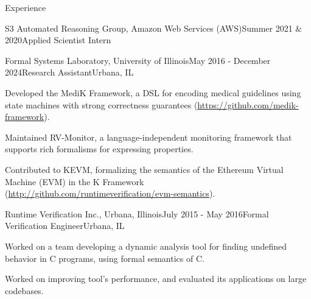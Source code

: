 \documentclass{resume} %
\begin{document}
\begin{rSection}{Experience}
\begin{rSubsection}{S3 Automated Reasoning Group, Amazon Web Services
  (AWS)}{Summer 2021 \& 2020}{Applied Scientist Intern}{}
\end{rSubsection}

\newpage
\begin{rSubsection}{Formal Systems Laboratory, University of Illinois}{May 2016 - December 2024}{Research Assistant}{Urbana, IL}
\item Developed the MediK Framework, a DSL for encoding medical guidelines using
  state machines with strong correctness guarantees (\url{https://github.com/medik-framework}).
\item Maintained RV-Monitor, a language-independent monitoring
  framework that supports rich formalisms for expressing properties.
\item Contributed to KEVM, formalizing the semantics of the Ethereum Virtual
  Machine (EVM) in the K Framework (\url{http://github.com/runtimeverification/evm-semantics}).
\end{rSubsection}
\begin{rSubsection}{Runtime Verification Inc., Urbana, Illinois}{July 2015 - May 2016}{Formal Verification Engineer}{Urbana, IL}
\item Worked on a team developing a dynamic analysis tool for finding undefined behavior in C programs, using formal semantics of C.
\item Worked on improving tool's performance, and evaluated its applications on large codebases.
\end{rSubsection}

%

\end{rSection}
\end{document}
